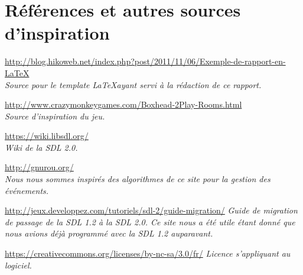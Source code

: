 \section*{Références et autres sources d'inspiration}

\url{http://blog.hikoweb.net/index.php?post/2011/11/06/Exemple-de-rapport-en-LaTeX} \\
\emph{Source pour le template \LaTeX ayant servi à la rédaction de ce rapport.}

\url{http://www.crazymonkeygames.com/Boxhead-2Play-Rooms.html} \\
\emph{Source d'inspiration du jeu.}

\url{https://wiki.libsdl.org/} \\
\emph{Wiki de la SDL 2.0.}

\url{http://gnurou.org/} \\
\emph{Nous nous sommes inspirés des algorithmes de ce site pour la gestion des événements.}

\url{http://jeux.developpez.com/tutoriels/sdl-2/guide-migration/}
\emph{Guide de migration de passage de la SDL 1.2 à la SDL 2.0. Ce site nous a été utile étant donné
que nous avions déjà programmé avec la SDL 1.2 auparavant.}

\url{https://creativecommons.org/licenses/by-nc-sa/3.0/fr/}
\emph{Licence s'appliquant au logiciel.}

